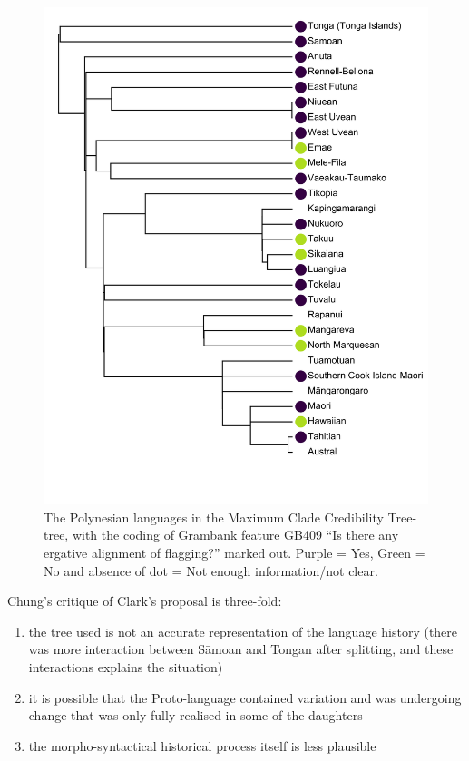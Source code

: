\documentclass[12pt,letterpaper]{article}
\begin{document}
\begin{figure}[ht]
\centering
\includegraphics[width=15cm]{illustrations/plots_from_R//tree_plots/poly_tree_example.png}
\caption{{The Polynesian languages in the \citet{grayetal_2009} Maximum Clade Credibility Tree-tree, with the coding of Grambank feature GB409 ``Is there any ergative alignment of flagging?'' marked out. Purple = Yes, Green = No and absence of dot = Not enough information/not clear.}}
\label{poly_GB409_tree}
\end{figure} 

Chung's critique of Clark's proposal is three-fold: 
\begin{enumerate}[label=(\alph*)]
\item the tree used is not an accurate representation of the language history (there was more interaction between S\={a}moan and Tongan after splitting, and these interactions explains the situation)
\item it is possible that the Proto-language contained variation and was undergoing change that was only fully realised in some of the daughters
\item the morpho-syntactical historical process itself is less plausible
\end{enumerate}
\end{document}
